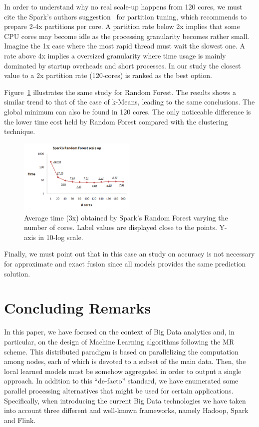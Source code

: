 \documentclass[3p,review]{elsarticle}
\begin{document}
In order to understand why no real scale-up happens from 120 cores, we must cite the Spark's authors suggestion~\cite{mllibguide} for partition tuning, which recommends to prepare 2-4x partitions per core. A partition rate below 2x implies that some CPU cores may become idle as the processing granularity becomes rather small. Imagine the 1x case where the most rapid thread must wait the slowest one. A rate above 4x implies a oversized granularity where time usage is mainly dominated by startup overheads and short processes. In our study the closest value to a 2x partition rate (120-cores) is ranked as the best option. 

Figure~\ref{fig:rf-spark} illustrates the same study for Random Forest. The results shows a similar trend to that of the case of k-Means, leading to the same conclusions. The global minimum can also be found in 120 cores. The only noticeable difference is the lower time cost held by Random Forest compared with the clustering technique.

\begin{figure}[!htp]
    \centering
    \includegraphics[width=0.5\textwidth]{rf-spark}
    \caption{Average time (3x) obtained by Spark's Random Forest varying the number of cores. Label values are displayed close to the points. Y-axis in 10-log scale.}
    \label{fig:rf-spark}
\end{figure}

Finally, we must point out that in this case an study on accuracy is not necessary for approximate and exact fusion since all models provides the same prediction solution.

\section{Concluding Remarks}\label{sec:conclusions}

In this paper, we have focused on the context of Big Data analytics and, in particular, on the design of Machine Learning algorithms following the MR scheme. This distributed paradigm is based on parallelizing the computation among nodes, each of which is devoted to a subset of the main data. Then, the local learned models must be somehow aggregated in order to output a single approach. In addition to this ``de-facto'' standard, we have enumerated some parallel processing alternatives that might be used for certain applications. Specifically, when introducing the current Big Data technologies we have taken into account three different and well-known frameworks, namely Hadoop, Spark and Flink.
\end{document}
